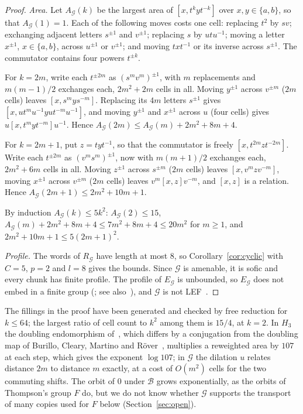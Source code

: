\begin{proof}
\emph{Area.} Let $A_{\mathcal G}(k)$ be the largest area of $[x,t^kyt^{-k}]$ over $x,y\in\{a,b\}$, so that $A_{\mathcal G}(1)=1$. Each of the following moves costs one
cell: replacing $t^2$ by $sv$; exchanging adjacent letters $s^{\pm1}$ and $v^{\pm1}$; replacing $s$ by $utu^{-1}$; moving a letter $x^{\pm1}$,
$x\in\{a,b\}$, across $u^{\pm1}$ or $v^{\pm1}$; and moving $txt^{-1}$ or its inverse across $s^{\pm1}$. The commutator contains four powers
$t^{\pm k}$.

For $k=2m$, write each $t^{\pm2m}$ as $(s^mv^m)^{\pm1}$, with $m$ replacements and $m(m-1)/2$ exchanges each, $2m^2+2m$ cells in all. Moving
$y^{\pm1}$ across $v^{\pm m}$ ($2m$ cells) leaves $[x,s^mys^{-m}]$. Replacing its $4m$ letters $s^{\pm1}$ gives
$[x,ut^mu^{-1}yut^{-m}u^{-1}]$, and moving $y^{\pm1}$ and $x^{\pm1}$ across $u$ (four cells) gives $u[x,t^myt^{-m}]u^{-1}$. Hence
$A_{\mathcal G}(2m)\le A_{\mathcal G}(m)+2m^2+8m+4$.

For $k=2m+1$, put $z=tyt^{-1}$, so that the commutator is freely $[x,t^{2m}zt^{-2m}]$. Write each $t^{\pm2m}$ as $(v^ms^m)^{\pm1}$, now with
$m(m+1)/2$ exchanges each, $2m^2+6m$ cells in all. Moving $z^{\pm1}$ across $s^{\pm m}$ ($2m$ cells) leaves $[x,v^mzv^{-m}]$, moving
$x^{\pm1}$ across $v^{\pm m}$ ($2m$ cells) leaves $v^m[x,z]v^{-m}$, and $[x,z]$ is a relation. Hence $A_{\mathcal G}(2m+1)\le2m^2+10m+1$.

By induction $A_{\mathcal G}(k)\le5k^2$: $A_{\mathcal G}(2)\le15$, $A_{\mathcal G}(m)+2m^2+8m+4\le7m^2+8m+4\le20m^2$ for $m\ge1$, and $2m^2+10m+1\le5(2m+1)^2$.

\emph{Profile.} The words of $R_{\mathcal G}$ have length at most $8$, so Corollary~\ref{cor:cyclic} with $C=5$, $p=2$ and $l=8$ gives the
bounds. Since $\mathcal G$ is amenable, it is sofic and every chunk has finite profile. The profile of $E_{\mathcal G}$ is unbounded, so
$E_{\mathcal G}$ does not embed in a finite group (\cite[Fact~3.5]{Cornulier2013}; see also~\cite[Lemma~2.1]{DouglasMghirbiA}), and $\mathcal G$ is not
LEF~\cite[Fact~3.8]{Cornulier2013}.
\end{proof}

The fillings in the proof have been generated and checked by free reduction for $k\le64$; the largest ratio of cell count to $k^2$ among
them is $15/4$, at $k=2$. In $H_3$ the doubling endomorphism of~\cite[Section~3]{DouglasMghirbiA}, which differs by a conjugation from the doubling
map of Burillo, Cleary, Martino and R\"over~\cite[Section~7]{BCMR2016}, multiplies a reweighted area by $107$ at each step, which gives the exponent $\log107$; in
$\mathcal G$ the dilation $u$ relates distance $2m$ to distance $m$ exactly, at a cost of $O(m^2)$ cells for the two commuting shifts. The orbit of $0$ under $\mathcal B$
grows exponentially, as the orbits of Thompson's group $F$ do, but we do not know whether $\mathcal G$ supports the transport of many
copies used for $F$ below (Section~\ref{sec:open}).


